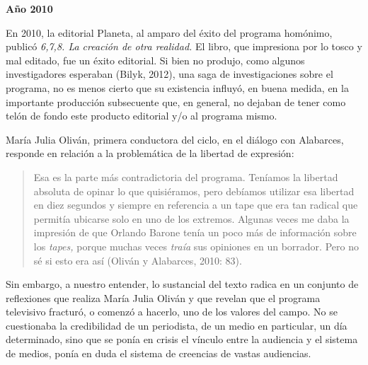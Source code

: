 {%
\textbf{Año 2010}

En 2010, la editorial Planeta, al amparo del éxito del programa homónimo, publicó \emph{6,7,8. La creación de otra realidad.} El libro, que impresiona por lo tosco y mal editado, fue un éxito editorial. Si bien no produjo, como algunos investigadores esperaban (Bilyk, 2012), una saga de investigaciones sobre el programa, no es menos cierto que su existencia influyó, en buena medida, en la importante producción subsecuente que, en general, no dejaban de tener como telón de fondo este producto editorial y/o al programa mismo.

María Julia Oliván, primera conductora del ciclo, en el diálogo con Alabarces, responde en relación a la problemática de la libertad de expresión:

\begin{quote}
Esa es la parte más contradictoria del programa. Teníamos la libertad absoluta de opinar lo que quisiéramos, pero debíamos utilizar esa libertad en diez segundos y siempre en referencia a un tape que era tan radical que permitía ubicarse solo en uno de los extremos. Algunas veces me daba la impresión de que Orlando Barone tenía un poco más de información sobre los \emph{tapes,} porque muchas veces \emph{traía} sus opiniones en un borrador. Pero no sé si esto era así (Oliván y Alabarces, 2010: 83).
\end{quote}

Sin embargo, a nuestro entender, lo sustancial del texto radica en un conjunto de reflexiones que realiza María Julia Oliván y que revelan que el programa televisivo fracturó, o comenzó a hacerlo, uno de los valores del campo. No se cuestionaba la credibilidad de un periodista, de un medio en particular, un día determinado, sino que se ponía en crisis el vínculo entre la audiencia y el sistema de medios, ponía en duda el sistema de creencias de vastas audiencias.

}
